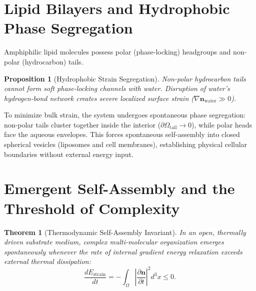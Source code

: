 \documentclass[11pt,a4paper]{article}
\newtheorem{prop}{Proposition}
\newtheorem{thm}{Theorem}
\begin{document}
	\section{Lipid Bilayers and Hydrophobic Phase Segregation}
	\label{sec:lipid_membranes}
	
	Amphiphilic lipid molecules possess polar (phase-locking) headgroups and non-polar (hydrocarbon) tails.
	
	\begin{prop}[Hydrophobic Strain Segregation]
		\label{prop:hydrophobic_effect}
		Non-polar hydrocarbon tails cannot form soft phase-locking channels with water. Disruption of water's hydrogen-bond network creates severe localized surface strain ($\nabla \mathbf{n}_{\text{water}} \gg 0$).
	\end{prop}
	
	To minimize bulk strain, the system undergoes spontaneous phase segregation: non-polar tails cluster together inside the interior ($\partial \Omega_{\text{tail}} \to 0$), while polar heads face the aqueous envelopes. This forces spontaneous self-assembly into closed spherical vesicles (liposomes and cell membranes), establishing physical cellular boundaries without external energy input.
	
	\section{Emergent Self-Assembly and the Threshold of Complexity}
	\label{sec:self_assembly_principle}
	
	\begin{thm}[Thermodynamic Self-Assembly Invariant]
		\label{thm:self_assembly}
		In an open, thermally driven substrate medium, complex multi-molecular organization emerges spontaneously whenever the rate of internal gradient energy relaxation exceeds external thermal dissipation:
		\begin{equation}
			\frac{d E_{\text{strain}}}{dt} = -\int_{\Omega} \left| \frac{\partial \mathbf{n}}{\partial t} \right|^2 d^3x \le 0.
			\label{eq:self_assembly_dissipation}
		\end{equation}
	\end{thm}
	
\end{document}
